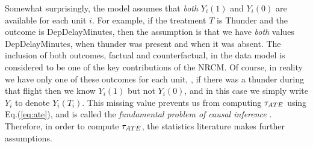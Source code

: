 Somewhat surprisingly, the model assumes that {\em both} $Y_i(1)$ and
$Y_i(0)$ are available for each unit $i$.  For example, if the
treatment $T$ is Thunder and the outcome is DepDelayMinutes, then the
assumption is that we have {\em both} values DepDelayMinutes, when
thunder was present and when it was absent.  The inclusion of both
outcomes, factual and counterfactual, in the data model is considered
to be one of the key contributions of the NRCM.
Of course, in reality we have only one of these outcomes for each
unit, \eg, if there was a thunder during that flight then we know
$Y_i(1)$ but not $Y_i(0)$, and in this case we simply write $Y_i$ to
denote $Y_i(T_i)$.  This missing value prevents us from computing
${\tau_{ATE}}$ using Eq.(\ref{eq:ate}), and is called the {\em fundamental
  problem of causal inference} \cite{Holland1986}.  Therefore, in
order to compute ${\tau_{ATE}}$, the statistics literature makes further
assumptions.



